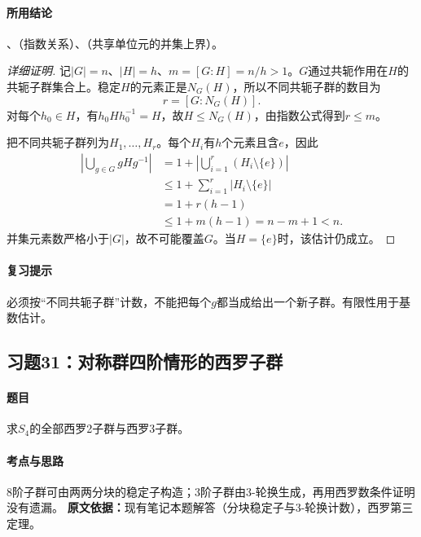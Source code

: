 \paragraph{所用结论}、（指数关系）、（共享单位元的并集上界）。
\begin{proof}[详细证明]
记$|G|=n$、$|H|=h$、$m=[G:H]=n/h>1$。$G$通过共轭作用在$H$的共轭子群集合上。稳定$H$的元素正是$N_G(H)$，所以不同共轭子群的数目为
\[
r=[G:N_G(H)].
\]
对每个$h_0\in H$，有$h_0Hh_0^{-1}=H$，故$H\le N_G(H)$，由指数公式得到$r\le m$。

把不同共轭子群列为$H_1,\ldots,H_r$。每个$H_i$有$h$个元素且含$e$，因此
\begin{align*}
\left|\bigcup_{g\in G}gHg^{-1}\right|
&=1+\left|\bigcup_{i=1}^r(H_i\setminus\{e\})\right|\\
&\le1+\sum_{i=1}^r|H_i\setminus\{e\}|\\
&=1+r(h-1)\\
&\le1+m(h-1)=n-m+1<n.
\end{align*}
并集元素数严格小于$|G|$，故不可能覆盖$G$。当$H=\{e\}$时，该估计仍成立。
\end{proof}
\paragraph{复习提示}必须按“不同共轭子群”计数，不能把每个$g$都当成给出一个新子群。有限性用于基数估计。

\subsection{习题31：对称群四阶情形的西罗子群}
\paragraph{题目}求$S_4$的全部西罗2子群与西罗3子群。
\paragraph{考点与思路}8阶子群可由两两分块的稳定子构造；3阶子群由3-轮换生成，再用西罗数条件证明没有遗漏。
\textbf{原文依据：}现有笔记本题解答（分块稳定子与3-轮换计数），西罗第三定理。
